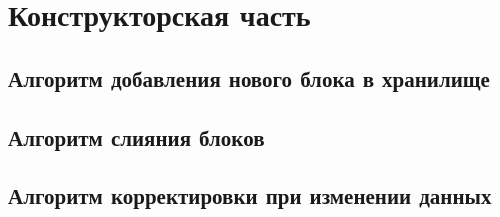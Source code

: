 \section{Конструкторская часть}

\subsection{Алгоритм добавления нового блока в хранилище}

\subsection{Алгоритм слияния блоков}

\subsection{Алгоритм корректировки при изменении данных}

\pagebreak